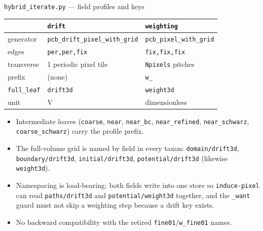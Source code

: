\documentclass[10pt,aspectratio=169]{beamer}
\newcommand{\ti}[1]{\texttt{\footnotesize #1}}
\begin{document}
\begin{frame}[allowframebreaks]{\texttt{hybrid\_iterate.py} --- field profiles and keys}
  \small
  \begin{center}
  \begin{tabular}{lll}
    \toprule
    & \ti{drift} & \ti{weighting} \\
    \midrule
    generator & \ti{pcb\_drift\_pixel\_with\_grid} & \ti{pcb\_pixel\_with\_grid} \\
    edges     & \ti{per,per,fix}   & \ti{fix,fix,fix} \\
    transverse& 1 periodic pixel tile & \ti{Npixels} pitches \\
    prefix    & (none)             & \ti{w\_} \\
    \ti{full\_leaf} & \ti{drift3d} & \ti{weight3d} \\
    unit      & V                  & dimensionless \\
    \bottomrule
  \end{tabular}
  \end{center}
  \begin{itemize}\small
  \item Intermediate leaves (\ti{coarse}, \ti{near}, \ti{near\_bc}, \ti{near\_refined},
        \ti{near\_schwarz}, \ti{coarse\_schwarz}) carry the profile prefix.
  \item The full-volume grid is named by field in every taxon:
        \ti{domain/drift3d}, \ti{boundary/drift3d}, \ti{initial/drift3d},
        \ti{potential/drift3d} (likewise \ti{weight3d}).
  \item Namespacing is load-bearing: both fields write into one store so \ti{induce-pixel}
        can read \ti{paths/drift3d} and \ti{potential/weight3d} together, and the
        \ti{\_want} guard must not skip a weighting step because a drift key exists.
  \item No backward compatibility with the retired \ti{fine01}/\ti{w\_fine01} names.
  \end{itemize}
\end{frame}
\end{document}
